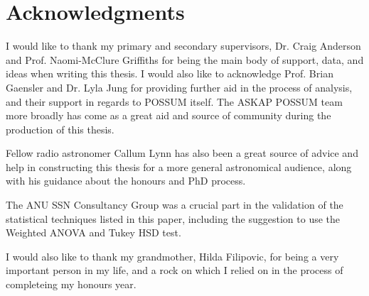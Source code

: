 \chapter*{Acknowledgments}


I would like to thank my primary and secondary supervisors, Dr. Craig Anderson and Prof. Naomi-McClure Griffiths for being the main body of support, data, and ideas when writing this thesis. I would also like to acknowledge Prof. Brian Gaensler and Dr. Lyla Jung for providing further aid in the process of analysis, and their support in regards to POSSUM itself. The ASKAP POSSUM team more broadly has come as a great aid and source of community during the production of this thesis.

Fellow radio astronomer Callum Lynn has also been a great source of advice and help in constructing this thesis for a more general astronomical audience, along with his guidance about the honours and PhD process.

The ANU SSN Consultancy Group was a crucial part in the validation of the statistical techniques listed in this paper, including the suggestion to use the Weighted ANOVA and Tukey HSD test.

I would also like to thank my grandmother, Hilda Filipovic, for being a very important person in my life, and a rock on which I relied on in the process of completeing my honours year.